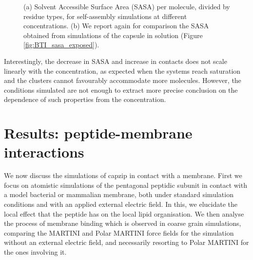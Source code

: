 \begin{figure}[t!]
\caption[Self-assembly simulations: SASA]{(a) Solvent Accessible Surface Area (SASA) per molecule, divided by residue types, for self-assembly simulations at different concentrations. (b) We report again for comparison the SASA obtained from simulations of the capsule in solution (Figure \ref{fig:BTI_sasa_exposed}).}
\label{fig:SA_sasa_all}
\end{figure}

Interestingly, the decrease in SASA and increase in contacts does not scale linearly with the concentration, as expected when the systems reach saturation and the clusters cannot favourably accommodate more molecules. However, the conditions simulated are not enough to extract more precise conclusion on the dependence of such properties from the concentration.
















\section{Results: peptide-membrane interactions}

We now discuss the simulations of capzip in contact with a membrane. First we focus on atomistic simulations of the pentagonal peptidic subunit in contact with a model bacterial or mammalian membrane, both under standard simulation conditions and with an applied external electric field. In this, we elucidate the local effect that the peptide has on the local lipid organisation.
%
We then analyse the process of membrane binding which is observed in coarse grain simulations, comparing the MARTINI and Polar MARTINI force fields for the simulation without an external electric field, and necessarily resorting to Polar MARTINI for the ones involving it. 


